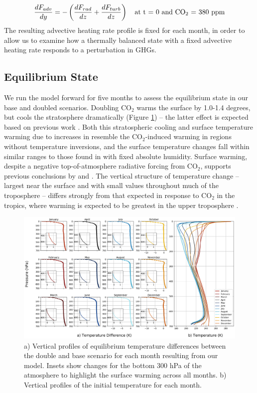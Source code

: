\documentclass[draft]{agujournal2019}
\begin{document}
\begin{equation}
    \frac{dF_{adv}}{dy} = -\left( \frac{dF_{rad}}{dz} + \frac{dF_{turb}}{dz} \right)\quad \text{at t = 0 and \ce{CO_2} = 380 ppm}
\end{equation}
The resulting advective heating rate profile is fixed for each month, in order to allow us to examine how a thermally balanced state with a fixed advective heating rate responds to a perturbation in GHGs. 
\subsection{Equilibrium State}
We run the model forward for five months to assess the equilibrium state in our base and doubled  scenarios. Doubling CO$_2$ warms the surface by 1.0-1.4 degrees, but cools the stratosphere dramatically (Figure \ref{fig:temp_dif})  -- the latter effect is expected based on previous work \cite{manabe_thermal_1967,langematz_thermal_2003}. Both this stratospheric cooling and surface temperature warming due to increases in  resemble the CO$_2$-induced warming in regions without temperature inversions, and the surface temperature changes fall within similar ranges to those found in  with fixed absolute humidity. Surface warming, despite a negative top-of-atmosphere radiative forcing from CO$_2$, supports previous conclusions by  and . The vertical structure of temperature change -- largest near the surface and with small values throughout much of the troposphere -- differs strongly from that expected in response to CO$_2$ in the tropics, where warming is expected to be greatest in the upper troposphere \cite{fu_warming_2011}.

\begin{figure}[htb!]
\noindent\includegraphics[width=1\textwidth]{figures/temp_dif.png}
\centering
\caption{a) Vertical profiles of equilibrium temperature differences between the double and base  scenario for each month resulting from our model. Insets show changes for the bottom 300 hPa of the atmosphere to highlight the surface warming across all months. b) Vertical profiles of the initial temperature for each month.}
\label{fig:temp_dif}
\end{figure}
\end{document}
